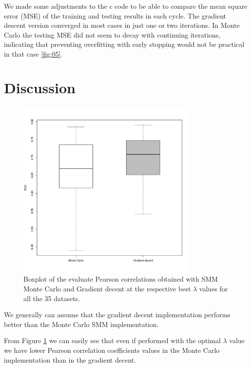 \documentclass{bioinfo}
\begin{document}
\begin{application}
\par We made some adjustments to the c code to be able to compare the mean square error (MSE) of the training and testing results in each cycle. The gradient descent version converged in most cases in just one or two iterations. In Monte Carlo the testing MSE did not seem to decay with continuing iterations, indicating that preventing overfitting with early stopping would not be practical in that case \ref{fig:05}.



\section*{Discussion}



\begin{figure}[!tpb]
\centerline{\includegraphics[width=9cm]{fig/boxplot.pdf}}
\caption{Boxplot of the evaluate Pearson correlations obtained with SMM Monte Carlo and Gradient decent at the respective best $\lambda$ values for all the 35 datasets.}
\label{fig:06}
\end{figure}




\par We generally can assume that the gradient decent implementation performs better than the Monte Carlo SMM implementation. 
\par From Figure \ref{fig:06} we can easily see that even if performed with the optimal $\lambda$ value we have lower Pearson correlation coefficients values in the Monte Carlo implementation than in the gradient decent.

\newpage





%
%
%
%
%






\end{application}
\end{document}

